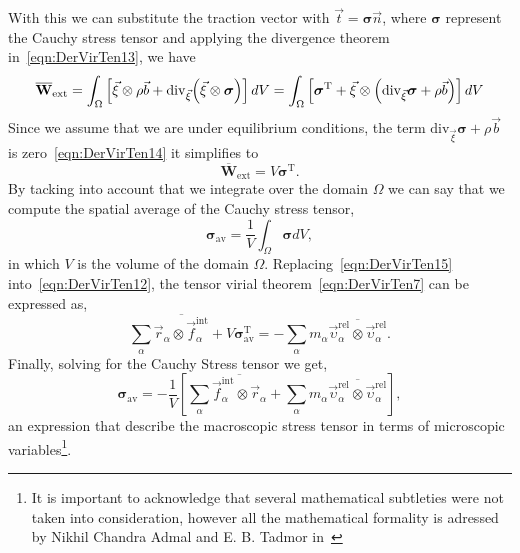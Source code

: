 With this we can substitute the traction vector with $\vec{t}=\bm{\sigma}\vec{n}$, where $\bm{\sigma}$ represent the Cauchy stress tensor and applying the divergence theorem in~\eqref{eqn:DerVirTen13}, we have 
\begin{equation}
    \overline{\mathbf{W}}_{\mathrm{ext}}
     =\int_{\Omega}
        \left[
            \vec{\xi}\otimes\rho\vec{b}+\mathrm{div}_{\vec{\xi}}\qty(\vec{\xi}\otimes\bm{\sigma})
        \right]dV
        =
    \int_{\Omega}
        \left[
            \bm{\sigma}^{\mathrm{T}}
            +
            \vec{\xi}\otimes\qty(\mathrm{div}_{\vec{\xi}}\bm{\sigma}+\rho\vec{b})
        \right]dV\label{eqn:DerVirTen14}
\end{equation}
Since we assume that we are under equilibrium conditions, the term $\mathrm{div}_{\vec{\xi}}\bm{\sigma}+\rho\vec{b}$ is zero~\eqref{eqn:DerVirTen14} it simplifies to
\begin{equation}
    \overline{\mathbf{W}}_{\mathrm{ext}}
    =V\bm{\sigma}^{\mathrm{T}}\label{eqn:DerVirTen15}.
\end{equation}
By tacking into account that we integrate over the domain $\Omega$ we can say that we compute the spatial average of the Cauchy stress tensor,
\begin{equation}
    \bm{\sigma}_{\mathrm{av}} =\frac{1}{V}\int_\Omega\bm{\sigma}dV\label{eqn:DerVirTen16},
\end{equation}
in which $V$ is the volume of the domain $\Omega$.
Replacing~\eqref{eqn:DerVirTen15} into~\eqref{eqn:DerVirTen12}, the tensor virial theorem~\eqref{eqn:DerVirTen7} can be expressed as,
\begin{equation}
    \sum_\alpha\overline{\vec{r}_\alpha\otimes\vec{f}_\alpha^{\mathrm{int}}}
    +
    V\bm{\sigma}_{\mathrm{av}}^{\mathrm{T}}
    =
    -\sum_\alpha m_\alpha\overline{\vec{\upsilon}_\alpha^{\mathrm{rel}}\otimes\vec{\upsilon}_\alpha^{\mathrm{rel}}}.\label{eqn:DerVirTen17}
\end{equation}
Finally, solving for the Cauchy Stress tensor we get,
\begin{equation}
    \bm{\sigma}_{\mathrm{av}}
    =
    -\frac{1}{V}
    \left[
        \sum_\alpha\overline{\vec{f}_\alpha^{\mathrm{int}}\otimes\vec{r}_\alpha}
        +
        \sum_\alpha m_\alpha\overline{\vec{\upsilon}_\alpha^{\mathrm{rel}}\otimes\vec{\upsilon}_\alpha^{\mathrm{rel}}}
    \right],\label{eqn:DerVirTen18}
\end{equation}
an expression that describe the macroscopic stress tensor in terms of microscopic variables\footnote{It is important to acknowledge that several mathematical subtleties were not taken into consideration, however all the mathematical formality is adressed by Nikhil Chandra Admal and E. B. Tadmor in~\citep{admalUnifiedInterpretationStress2010}}.

